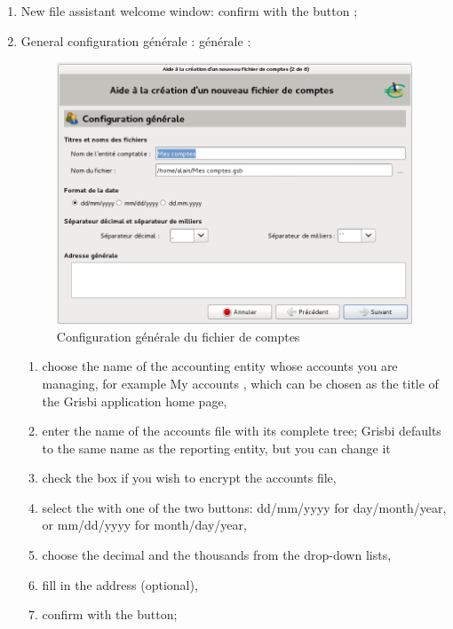 \begin{enumerate}
\item New file assistant welcome window: confirm with the  button ;
\item General configuration
\ifIllustration générale :
\else générale :
\fi

\ifIllustration
\begin{figure}[htbp]
\begin{center}
\includegraphics[scale=0.5]{image/screenshot/start_file_create}
\end{center}
\caption{Configuration générale du fichier de comptes}
\label{start-file-create-img}
\end{figure}
\fi

\begin{enumerate} 
 \item choose the name of the accounting entity whose accounts you are managing, for example \og My accounts \fg{}, which can be chosen as the title of the Grisbi application home page,
\item enter the name of the accounts file with its complete tree; Grisbi defaults to the same name as the reporting entity, but you can change it
\item check the   box if you wish to \gls{encrypt} the accounts file,
\item select the  with one of the two buttons: dd/mm/yyyy for day/month/year, or  mm/dd/yyyy for month/day/year,
\item choose the decimal  and the thousands from the drop-down lists,
 \item fill in the address (optional),
 \item  confirm with the   button;
\end{enumerate}


\end{enumerate}
